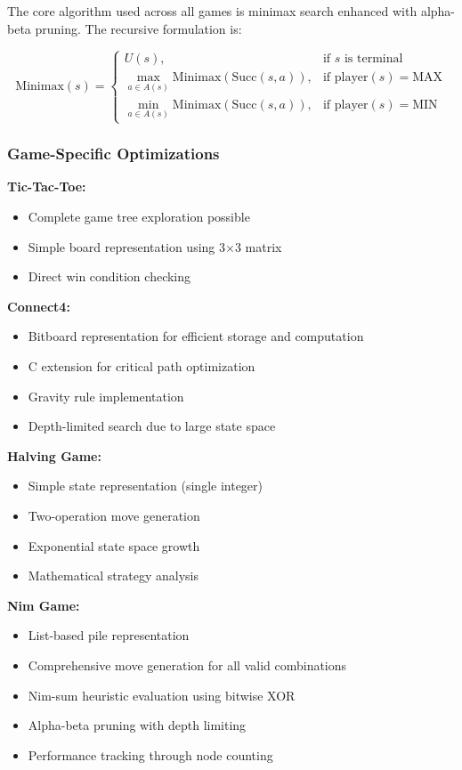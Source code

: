 \documentclass[12pt]{article}
\begin{document}
The core algorithm used across all games is minimax search enhanced with alpha-beta pruning. The recursive formulation is:

\[
\text{Minimax}(s) =
\begin{cases}
U(s), & \text{if } s \text{ is terminal} \\
\max_{a \in A(s)} \text{Minimax}(\text{Succ}(s, a)), & \text{if } \text{player}(s) = \text{MAX} \\
\min_{a \in A(s)} \text{Minimax}(\text{Succ}(s, a)), & \text{if } \text{player}(s) = \text{MIN}
\end{cases}
\]

\subsubsection{Game-Specific Optimizations}

\textbf{Tic-Tac-Toe:}
\begin{itemize}
    \item Complete game tree exploration possible
    \item Simple board representation using 3$\times$3 matrix
    \item Direct win condition checking
\end{itemize}

\textbf{Connect4:}
\begin{itemize}
    \item Bitboard representation for efficient storage and computation
    \item C extension for critical path optimization
    \item Gravity rule implementation
    \item Depth-limited search due to large state space
\end{itemize}

\textbf{Halving Game:}
\begin{itemize}
    \item Simple state representation (single integer)
    \item Two-operation move generation
    \item Exponential state space growth
    \item Mathematical strategy analysis
\end{itemize}

\textbf{Nim Game:}
\begin{itemize}
    \item List-based pile representation
    \item Comprehensive move generation for all valid combinations
    \item Nim-sum heuristic evaluation using bitwise XOR
    \item Alpha-beta pruning with depth limiting
    \item Performance tracking through node counting
\end{itemize}
\end{document}
